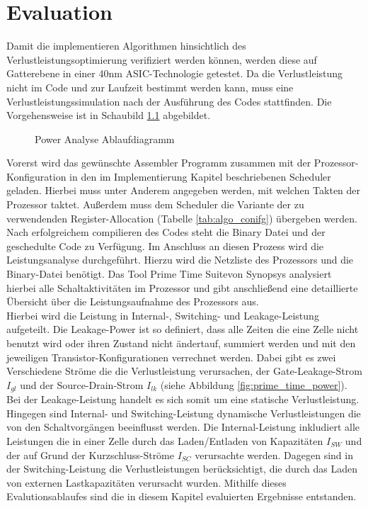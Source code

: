 \chapter{Evaluation}
\label{chap:evaluation} 
Damit die implementieren Algorithmen hinsichtlich des Verlustleistungsoptimierung verifiziert werden können, werden diese auf Gatterebene in einer 40nm ASIC-Technologie getestet. Da die Verlustleistung nicht im Code und zur Laufzeit bestimmt werden kann, muss eine Verlustleistungssimulation nach der Ausführung des Codes stattfinden. Die Vorgehensweise ist in Schaubild \ref{fig:flow_power_analyse} abgebildet.

\begin{scriptsize}
	\begin{figure}[htbp] 
		\centering
		
		\caption{Power Analyse Ablaufdiagramm}
		\label{fig:flow_power_analyse}
	\end{figure}
\end{scriptsize}

Vorerst wird das gewünschte Assembler Programm zusammen mit der Prozessor-Konfiguration in den im Implementierung Kapitel beschriebenen Scheduler geladen. Hierbei muss unter Anderem angegeben werden, mit welchen Takten der Prozessor taktet. Außerdem muss dem Scheduler die Variante der zu verwendenden Register-Allocation (Tabelle \ref{tab:algo_conifg}) übergeben werden. Nach erfolgreichem compilieren des Codes steht die Binary Datei und der geschedulte Code zu Verfügung. Im Anschluss an diesen Prozess wird die Leistungsanalyse durchgeführt. Hierzu wird die Netzliste des Prozessors und die Binary-Datei benötigt. Das Tool \glqq Prime Time Suite\grqq von Synopsys analysiert hierbei alle Schaltaktivitäten im Prozessor und gibt anschließend eine detaillierte Übersicht über die Leistungsaufnahme des Prozessors aus.\\
Hierbei wird die Leistung in Internal-, Switching- und Leakage-Leistung aufgeteilt. Die Leakage-Power ist so definiert, dass alle Zeiten die eine Zelle nicht benutzt wird oder ihren Zustand nicht ändertauf, summiert werden und mit den jeweiligen Transistor-Konfigurationen verrechnet werden. Dabei gibt es zwei Verschiedene Ströme die die Verlustleistung verursachen, der Gate-Leakage-Strom $I_{gl}$ und der Source-Drain-Strom $I_{lk}$ (siehe Abbildung \ref{fig:prime_time_power}).  Bei der Leakage-Leistung handelt es sich somit um eine statische Verlustleistung. Hingegen sind Internal- und Switching-Leistung dynamische Verlustleistungen die von den Schaltvorgängen beeinflusst werden. Die Internal-Leistung inkludiert alle Leistungen die in einer Zelle durch das Laden/Entladen von Kapazitäten $I_{SW}$ und der auf Grund der Kurzschluss-Ströme $I_{SC}$ verursachte werden. Dagegen sind in der Switching-Leistung die Verlustleistungen berücksichtigt, die durch das Laden von externen Lastkapazitäten verursacht wurden.\cite{primeTime2016}
Mithilfe dieses Evalutionsablaufes sind die in diesem Kapitel evaluierten Ergebnisse entstanden.
